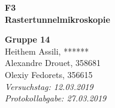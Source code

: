 


	
\begin{titlepage}
	\thispagestyle{empty}
	
%
%
%
	
	\hspace{0pt}
	\vspace{2cm}
	\begin{center}
		\hdashrule{\linewidth}{1pt}{}
		\vskip -0.5cm
		\hdashrule{\linewidth}{0.5pt}{}
		
		\vspace{0.5cm}
		\Huge{ \textbf{ F3 \\}}
		\LARGE{ \textbf{Rastertunnelmikroskopie} } 
		
		\hdashrule{\linewidth}{0.5pt}{}
		\vskip -0.95cm
		\hdashrule{\linewidth}{1pt}{}
		
		\vspace{3cm}
		\Large{\textbf{ Gruppe 14 \\}}
		\Large{Heithem Assili, ****** \\ Alexandre Drouet, 358681 \\ Olexiy Fedorets, 356615 \\}
		\vspace{1cm}
		\Large{\textsl{ Versuchstag: 12.03.2019 \\ Protokollabgabe: 27.03.2019}}

		

		
	\end{center}
	\vfill
	
\end{titlepage}
	
	
	
\skippage
{}
\thispagestyle{plain}

